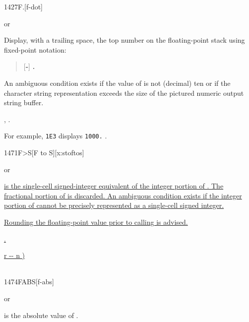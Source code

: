 \begin{worddef}[Fd]{1427}{F.{}}[f-dot]
\item \stack{}{}  or

	Display, with a trailing space, the top number on the
	floating-point stack using fixed-point notation:
	\begin{quote}
		[\textbf{-}] \textbf{.}
	\end{quote}
	An ambiguous condition exists if the value of 
	is not (decimal) ten or if the character string representation
	exceeds the size of the pictured numeric output string buffer.

\see {},
	.

	\begin{rationale} %
		For example, \texttt{1E3}  displays \texttt{1000.} .
	\end{rationale}
\end{worddef}



\begin{worddef*}[FtoS]{1471}{F>S}[F to S][x:stoftos]
\item {}  or 

	\uline{ is the single-cell signed-integer equivalent of the
	integer portion of .  The fractional portion of
	 is discarded.  An ambiguous condition exists if
	the integer portion of  cannot be precisely
	represented as a single-cell signed integer.}

\note \uline{Rounding the floating-point value prior to calling  is
	advised.}

\see \uline{.}

	\begin{implement}
		\uline{\word{:}   r -{}- n )} \\
		\tab \uline{ } \\
		\uline{\word{;}}
	\end{implement}
\end{worddef*}


\begin{worddef}{1474}{FABS}[f-abs]
\item {} or

	 is the absolute value of .
\end{worddef}


